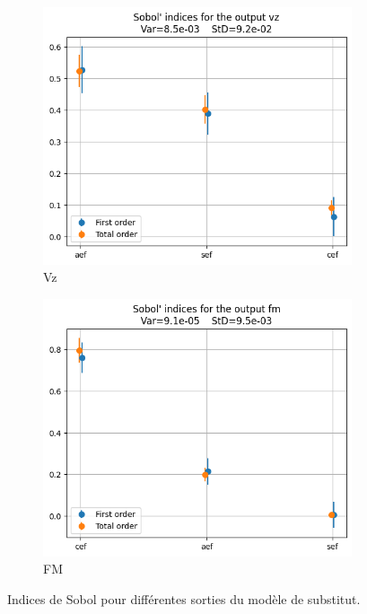 \documentclass[a4paper, 11pt]{article}
\begin{document}
\begin{figure}[H]
    \vspace{10pt} %

    \begin{subfigure}[b]{0.45\textwidth}
        \includegraphics[width=\textwidth]{Images_Ayoub/Problem2/UseCase1/Sobol_Indices/vz.png}
        \caption{Vz}
        \label{fig:vz}
    \end{subfigure}
    \hfill
    \begin{subfigure}[b]{0.45\textwidth}
        \includegraphics[width=\textwidth]{Images_Ayoub/Problem2/UseCase1/Sobol_Indices/fm.png}
        \caption{FM}
        \label{fig:fm}
    \end{subfigure}

    \caption{Indices de Sobol pour différentes sorties du modèle de substitut.}
    \label{fig:sobol_indices}
\end{figure}
\end{document}

